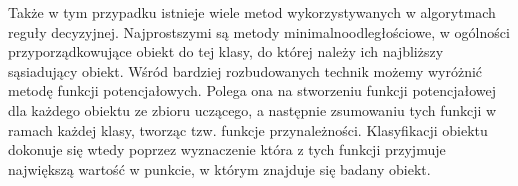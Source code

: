 Także w tym przypadku istnieje wiele metod wykorzystywanych w algorytmach reguły decyzyjnej. Najprostszymi są metody minimalnoodległościowe, w ogólności przyporządkowujące obiekt do tej klasy, do której należy ich najbliższy sąsiadujący obiekt. Wśród bardziej rozbudowanych technik możemy wyróżnić metodę funkcji potencjałowych. Polega ona na stworzeniu funkcji potencjałowej dla każdego obiektu ze zbioru uczącego, a następnie zsumowaniu tych funkcji w ramach każdej klasy, tworząc tzw. funkcje przynależności. Klasyfikacji obiektu dokonuje się wtedy poprzez wyznaczenie która z tych funkcji przyjmuje największą wartość w punkcie, w którym znajduje się badany obiekt.

